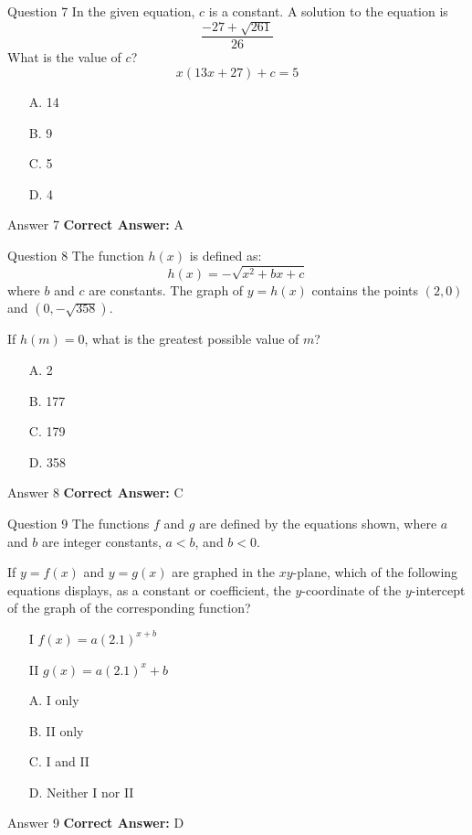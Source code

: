\documentclass{beamer}
\begin{document}
\begin{frame}{Question 7}
\small
In the given equation, \(c\) is a constant. A solution to the equation is
\[
\frac{-27 + \sqrt{261}}{26}
\]
What is the value of \(c\)?
\[
x(13x + 27) + c = 5
\]
\vspace{0.35cm}
\begin{enumerate}
    \item[A.] 14
    \item[B.] 9
    \item[C.] 5
    \item[D.] 4
\end{enumerate}
\end{frame}
\begin{frame}{Answer 7}
\small
\textbf{Correct Answer:} A
\end{frame}

\begin{frame}{Question 8}
\small
The function \(h(x)\) is defined as:
\[
h(x) = -\sqrt{x^2 + bx + c}
\]
where \(b\) and \(c\) are constants. The graph of \(y = h(x)\) contains the points \((2, 0)\) and \((0, -\sqrt{358})\).

If \(h(m) = 0\), what is the greatest possible value of \(m\)?
\vspace{0.35cm}
\begin{enumerate}
    \item[A.] 2
    \item[B.] 177
    \item[C.] 179
    \item[D.] 358
\end{enumerate}
\end{frame}
\begin{frame}{Answer 8}
\small
\textbf{Correct Answer:} C
\end{frame}

\begin{frame}{Question 9}
\small
The functions \(f\) and \(g\) are defined by the equations shown, where \(a\) and \(b\) are integer constants, \(a < b\), and \(b < 0\).

If \(y = f(x)\) and \(y = g(x)\) are graphed in the \(xy\)-plane, which of the following equations displays, as a constant or coefficient, the \(y\)-coordinate of the \(y\)-intercept of the graph of the corresponding function?

\begin{itemize}
\item[I] \(f(x) = a(2.1)^{x + b}\)
\item[II] \(g(x) = a(2.1)^x + b\)
\end{itemize}
\vspace{0.35cm}
\begin{enumerate}
    \item[A.] I only
    \item[B.] II only
    \item[C.] I and II
    \item[D.] Neither I nor II
\end{enumerate}
\end{frame}
\begin{frame}{Answer 9}
\small
\textbf{Correct Answer:} D
\end{frame}
\end{document}
